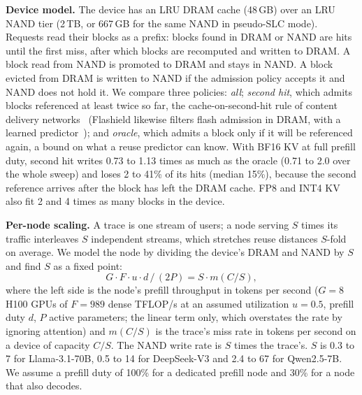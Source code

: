 \documentclass[acmsmall,screen,review]{acmart}
\begin{document}
\textbf{Device model.} The device has an LRU DRAM cache (48\,GB) over an LRU NAND tier (2\,TB,
or 667\,GB for the same NAND in pseudo-SLC mode). Requests read their blocks as a prefix: blocks
found in DRAM or NAND are hits until the first miss, after which blocks are recomputed and written
to DRAM. A block read from NAND is promoted to DRAM and stays in NAND. A block evicted from DRAM
is written to NAND if the admission policy accepts it and NAND does not hold it. We compare three
policies: \emph{all}; \emph{second hit}, which admits blocks referenced at least twice so far,
the cache-on-second-hit rule of content delivery networks~\cite{secondhit} (Flashield likewise
filters flash admission in DRAM, with a learned predictor~\cite{flashield}); and \emph{oracle},
which admits a block only if it will be referenced again, a bound on what a reuse predictor can
know. With BF16 KV at full prefill duty, second hit writes 0.73 to 1.13 times as much as the oracle
(0.71 to 2.0 over the whole sweep) and loses 2 to 41\% of its hits (median 15\%), because the
second reference arrives after the block has left the DRAM cache. FP8 and INT4 KV also
fit 2 and 4 times as many blocks in the device.

\textbf{Per-node scaling.} A trace is one stream of users; a node serving $S$ times its traffic
interleaves $S$ independent streams, which stretches reuse distances $S$-fold on average. We model the
node by dividing the device's DRAM and NAND by $S$ and find $S$ as a fixed point:
\begin{equation}
G \cdot F \cdot u \cdot d \,/\, (2P) = S \cdot m(C/S),
\end{equation}
where the left side is the node's prefill throughput in tokens per second ($G=8$ H100 GPUs of
$F=989$ dense TFLOP/s at an assumed utilization $u=0.5$, prefill duty $d$, $P$ active parameters;
the linear term only, which overstates the rate by ignoring attention) and $m(C/S)$
is the trace's miss rate in tokens per second on a device of capacity $C/S$. The NAND write rate
is $S$ times the trace's. $S$ is 0.3 to 7 for Llama-3.1-70B, 0.5 to 14 for DeepSeek-V3 and 2.4
to 67 for Qwen2.5-7B. We assume a prefill duty of 100\% for a dedicated prefill node and 30\% for a
node that also decodes.
\end{document}
